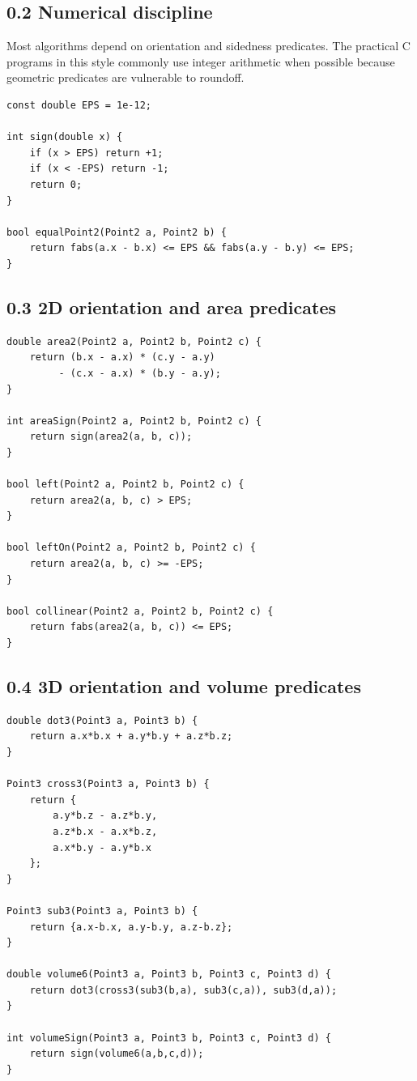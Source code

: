 \documentclass[11pt]{article}
\begin{document}
\subsection{0.2 Numerical discipline}\label{numerical-discipline}

Most algorithms depend on orientation and sidedness predicates. The
practical C programs in this style commonly use integer arithmetic when
possible because geometric predicates are vulnerable to roundoff.

\begin{verbatim}
const double EPS = 1e-12;

int sign(double x) {
    if (x > EPS) return +1;
    if (x < -EPS) return -1;
    return 0;
}

bool equalPoint2(Point2 a, Point2 b) {
    return fabs(a.x - b.x) <= EPS && fabs(a.y - b.y) <= EPS;
}
\end{verbatim}

\subsection{0.3 2D orientation and area
predicates}\label{d-orientation-and-area-predicates}

\begin{verbatim}
double area2(Point2 a, Point2 b, Point2 c) {
    return (b.x - a.x) * (c.y - a.y)
         - (c.x - a.x) * (b.y - a.y);
}

int areaSign(Point2 a, Point2 b, Point2 c) {
    return sign(area2(a, b, c));
}

bool left(Point2 a, Point2 b, Point2 c) {
    return area2(a, b, c) > EPS;
}

bool leftOn(Point2 a, Point2 b, Point2 c) {
    return area2(a, b, c) >= -EPS;
}

bool collinear(Point2 a, Point2 b, Point2 c) {
    return fabs(area2(a, b, c)) <= EPS;
}
\end{verbatim}

\subsection{0.4 3D orientation and volume
predicates}\label{d-orientation-and-volume-predicates}

\begin{verbatim}
double dot3(Point3 a, Point3 b) {
    return a.x*b.x + a.y*b.y + a.z*b.z;
}

Point3 cross3(Point3 a, Point3 b) {
    return {
        a.y*b.z - a.z*b.y,
        a.z*b.x - a.x*b.z,
        a.x*b.y - a.y*b.x
    };
}

Point3 sub3(Point3 a, Point3 b) {
    return {a.x-b.x, a.y-b.y, a.z-b.z};
}

double volume6(Point3 a, Point3 b, Point3 c, Point3 d) {
    return dot3(cross3(sub3(b,a), sub3(c,a)), sub3(d,a));
}

int volumeSign(Point3 a, Point3 b, Point3 c, Point3 d) {
    return sign(volume6(a,b,c,d));
}
\end{verbatim}
\end{document}
